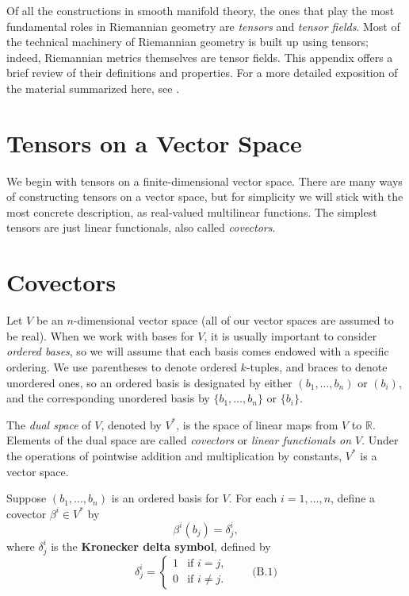 
Of all the constructions in smooth manifold theory, the ones that play the most fundamental roles in Riemannian geometry are \emph{tensors} and \emph{tensor fields}. Most of the technical machinery of Riemannian geometry is built up using tensors; indeed, Riemannian metrics themselves are tensor fields. This appendix offers a brief review of their definitions and properties. For a more detailed exposition of the material summarized here, see \cite{LeeSM}.

\section{Tensors on a Vector Space}

We begin with tensors on a finite-dimensional vector space. There are many ways of constructing tensors on a vector space, but for simplicity we will stick with the most concrete description, as real-valued multilinear functions. The simplest tensors are just linear functionals, also called \emph{covectors}.

\section{Covectors}

Let $V$ be an $n$-dimensional vector space (all of our vector spaces are assumed to be real). When we work with bases for $V$, it is usually important to consider \emph{ordered bases}, so we will assume that each basis comes endowed with a specific ordering. We use parentheses to denote ordered $k$-tuples, and braces to denote unordered ones, so an ordered basis is designated by either $(b_1,\ldots,b_n)$ or $(b_i)$, and the corresponding unordered basis by $\{b_1,\ldots,b_n\}$ or $\{b_i\}$.

The \emph{dual space} of $V$, denoted by $V^*$, is the space of linear maps from $V$ to $\mathbb{R}$. Elements of the dual space are called \emph{covectors} or \emph{linear functionals on $V$}. Under the operations of pointwise addition and multiplication by constants, $V^*$ is a vector space.

Suppose $(b_1,\ldots,b_n)$ is an ordered basis for $V$. For each $i = 1,\ldots,n$, define a covector $\beta^i \in V^*$ by
\[
\beta^i(b_j) = \delta^i_j,
\]
where $\delta^i_j$ is the \textbf{Kronecker delta symbol}, defined by
\[
\delta^i_j = \begin{cases} 1 & \text{if } i = j, \\ 0 & \text{if } i \ne j. \end{cases} \qquad \text{(B.1)}
\]

